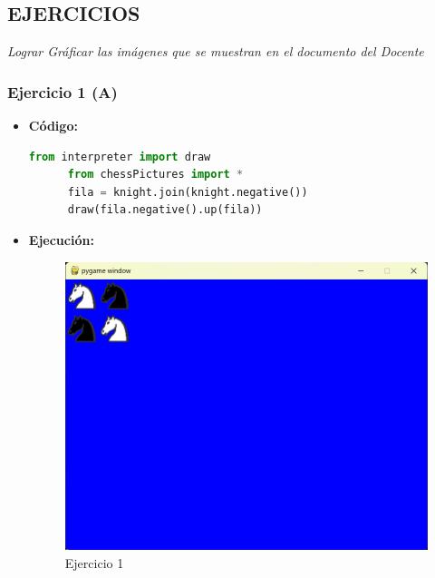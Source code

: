 \documentclass{article}
\begin{document}

  \newpage
  \subsection{EJERCICIOS}
  \textit{Lograr Gráficar las imágenes que se muestran en el documento del Docente}


  \subsubsection{Ejercicio 1 (A)}
  \begin{itemize}
    \item \textbf{Código:}
    \begin{lstlisting}[language=Python, caption=Ejercicio2a]
      from interpreter import draw
      from chessPictures import *
      fila = knight.join(knight.negative())
      draw(fila.negative().up(fila))
    \end{lstlisting}
    \item \textbf{Ejecución:}
    \begin{figure}[H]
      \centering
      \includegraphics[width=1\textwidth, keepaspectratio]{img/ejercicio2a.png}
      \caption{Ejercicio 1}
    \end{figure}
  \end{itemize}
  \newpage

\end{document}
